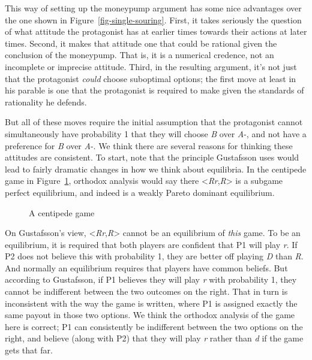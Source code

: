 \documentclass[
  11pt,
  letterpaper,
  DIV=11,
  numbers=noendperiod,
  twoside]{scrartcl}
\begin{document}
This way of setting up the moneypump argument has some nice advantages
over the one shown in Figure~\ref{fig-single-souring}. First, it takes
seriously the question of what attitude the protagonist has at earlier
times towards their actions at later times. Second, it makes that
attitude one that could be rational given the conclusion of the
moneypump. That is, it is a numerical credence, not an incomplete or
imprecise attitude. Third, in the resulting argument, it's not just that
the protagonist \emph{could} choose suboptimal options; the first move
at least in his parable is one that the protagonist is required to make
given the standards of rationality he defends.

But all of these moves require the initial assumption that the
protagonist cannot simultaneously have probability 1 that they will
choose \emph{B} over \emph{A}-, and not have a preference for \emph{B}
over \emph{A}-. We think there are several reasons for thinking these
attitudes are consistent. To start, note that the principle Gustafsson
uses would lead to fairly dramatic changes in how we think about
equilibria. In the centipede game in Figure~\ref{fig-centipede},
orthodox analysis would say there
\textless{}\emph{Rr},\emph{R}\textgreater{} is a subgame perfect
equilibrium, and indeed is a weakly Pareto dominant equilibrium.

\begin{figure}

\centering{



}

\caption{\label{fig-centipede}A centipede game}

\end{figure}%

On Gustafsson's view, \textless{}\emph{Rr},\emph{R}\textgreater{} cannot
be an equilibrium of \emph{this} game. To be an equilibrium, it is
required that both players are confident that P1 will play \emph{r}. If
P2 does not believe this with probability 1, they are better off playing
\emph{D} than \emph{R}. And normally an equilibrium requires that
players have common beliefs. But according to Gustafsson, if P1 believes
they will play \emph{r} with probability 1, they cannot be indifferent
between the two outcomes on the right. That in turn is inconsistent with
the way the game is written, where P1 is assigned exactly the same
payout in those two options. We think the orthodox analysis of the game
here is correct; P1 can consistently be indifferent between the two
options on the right, and believe (along with P2) that they will play
\emph{r} rather than \emph{d} if the game gets that far.
\end{document}
